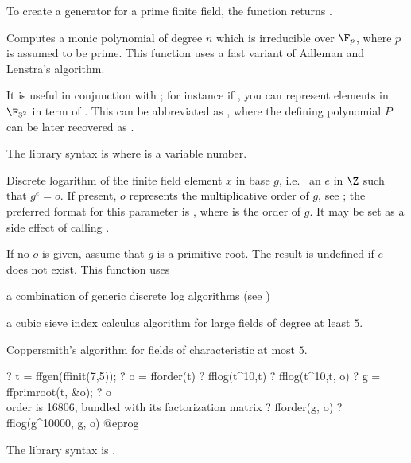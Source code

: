 To create a generator for a prime finite field, the function
 returns .

\label{se:ffinit}
Computes a monic polynomial of degree $n$ which is irreducible over
 $\F_p$, where $p$ is assumed to be prime. This function uses a fast variant
 of Adleman and Lenstra's algorithm.

It is useful in conjunction with ; for instance if
, you can represent elements in $\F_{3^2}$ in term of
. This can be abbreviated as
, where the defining polynomial $P$ can be later
recovered as .

The library syntax is  where  is a variable number.

\label{se:fflog}
Discrete logarithm of the finite field element $x$ in base $g$, i.e.~
an $e$ in $\Z$ such that $g^e = o$. If
present, $o$ represents the multiplicative order of $g$, see
; the preferred format for
this parameter is , where  is the
order of $g$. It may be set as a side effect of calling .

If no $o$ is given, assume that $g$ is a primitive root. The result is
undefined if $e$ does not exist. This function uses

\item a combination of generic discrete log algorithms (see )

\item a cubic sieve index calculus algorithm for large fields of degree at
least $5$.

\item Coppersmith's algorithm for fields of characteristic at most $5$.

\bprog
? t = ffgen(ffinit(7,5));
? o = fforder(t)
? fflog(t^10,t)
? fflog(t^10,t, o)
? g = ffprimroot(t, &o);
? o   \\ order is 16806, bundled with its factorization matrix
? fforder(g, o)
? fflog(g^10000, g, o)
@eprog

The library syntax is .

